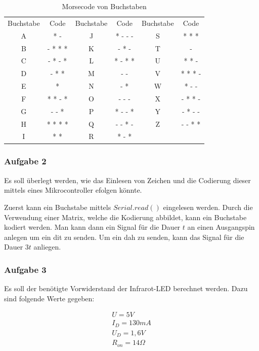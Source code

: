 \begin{table}[h]
    \centering
    \caption{Morsecode von Buchstaben}
    \label{tab:a7-morsecode}
    \begin{tabular}{| c | c | c | c | c | c |}
        \hline
        Buchstabe & Code & Buchstabe & Code & Buchstabe & Code \\
        A & * - & J & * - - - & S & * * * \\
        B & - * * * & K & - * - & T & - \\
        C & - * - * & L & * - * * & U & * * - \\
        D & - * * & M & - - & V & * * * - \\
        E & * & N & - * & W & * - - \\
        F & * * - * & O & - - - & X & - * * - \\
        G & - - * & P & * - - * & Y & - * - - \\
        H & * * * * & Q & - - * - & Z & - - * * \\
        I & * * & R & * - * & &  \\
        \hline
    \end{tabular}
\end{table}

\newpage

\subsubsection{Aufgabe 2}

Es soll überlegt werden, wie das Einlesen von Zeichen und die Codierung dieser mittels eines Mikrocontroller efolgen könnte.

Zuerst kann ein Buchstabe mittels $Serial.read()$ eingelesen werden.
Durch die Verwendung einer Matrix, welche die Kodierung abbildet, kann ein Buchstabe kodiert werden.
Man kann dann ein Signal für die Dauer $t$ an einen Ausgangspin anlegen um ein dit zu senden.
Um ein dah zu senden, kann das Signal für die Dauer $3t$ anliegen.

\subsubsection{Aufgabe 3}

Es soll der benötigte Vorwiderstand der Infrarot-LED berechnet werden.
Dazu sind folgende Werte gegeben:

\begin{align}
    U = 5V \\
    I_D = 130mA \\
    U_D = 1,6V \\
    R_{on} = 14\Omega
\end{align}

